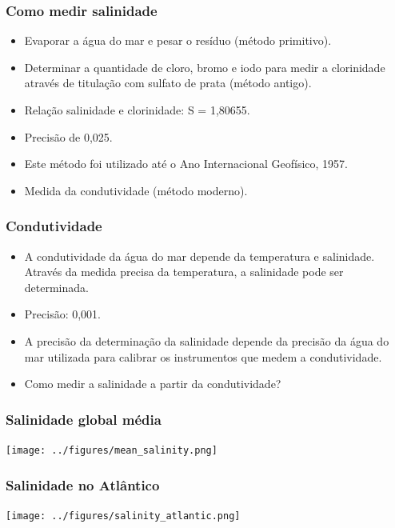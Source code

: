 \begin{frame}
\frametitle{Como medir salinidade}
    \small{
    \begin{itemize}[<+-| alert@+>]
    \item Evaporar a água do mar e pesar o resíduo (método primitivo).
    \item Determinar a quantidade de cloro, bromo e iodo para medir a
          clorinidade através de titulação com sulfato de prata (método
          antigo).
    \item Relação salinidade e clorinidade: S = 1,80655\textcelsius.
    \item Precisão de 0,025.
    \item Este método foi utilizado até o Ano Internacional Geofísico, 1957.
    \item Medida da condutividade (método moderno).
    \end{itemize}
    }
\end{frame}

\begin{frame}
\frametitle{Condutividade}
    \small{
    \begin{itemize}[<+-| alert@+>]
    \item A condutividade da água do mar depende da temperatura e salinidade.
          Através da medida precisa da temperatura, a salinidade pode ser
          determinada.
    \item Precisão: 0,001.
    \item A precisão da determinação da salinidade depende da precisão da água
          do mar utilizada para calibrar os instrumentos que medem a condutividade.
    \item Como medir a salinidade a partir da condutividade?
    \end{itemize}
    }
\end{frame}

\begin{frame}
\frametitle{Salinidade global média}
    \begin{center}
        \texttt{[image: ../figures/mean\_salinity.png]}
    \end{center}
\end{frame}

\begin{frame}
\frametitle{Salinidade no Atlântico}
    \begin{center}
        \texttt{[image: ../figures/salinity\_atlantic.png]}
    \end{center}
\end{frame}

